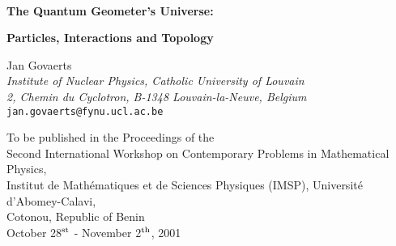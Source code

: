 \documentclass[a4paper,11pt]{article}
\begin{document}
%
\begin{titlepage}
\begin{centering}
 
{\ }\vspace{2cm}
 
{\Large\bf The Quantum Geometer's Universe:}

\vspace{5pt}

{\Large\bf Particles, Interactions and Topology}

\vspace{2cm}

Jan Govaerts\\
\vspace{1.0cm}
{\em Institute of Nuclear Physics, Catholic University of Louvain}\\
{\em 2, Chemin du Cyclotron, B-1348 Louvain-la-Neuve, Belgium}\\
{\tt jan.govaerts@fynu.ucl.ac.be}

\vspace{2cm}

\begin{abstract}

\noindent
With the two most profound conceptual revolutions of XX$^{\rm th}$ century
physics, quantum mechanics and relativity, which have culminated
into relativistic spacetime geometry and quantum gauge field theory
as the principles for gravity and the three other known fundamental
interactions, the physicist of the XXI$^{\rm st}$ century has inherited 
an unfinished symphony: the unification of the quantum and the
continuum. As an invitation to tomorrow's quantum geometers who
must design the new rulers by which to size up the Universe at those
scales where the smallest meets the largest, these lectures review the 
basic principles of today's conceptual framework, and highlight by way 
of simple examples the interplay that presently exists between the
quantum world of particle interactions and the classical world of
geometry and topology.

\end{abstract}

\vspace{35pt}
 
To be published in the Proceedings of the\\
Second International Workshop on Contemporary Problems in Mathematical
Physics,\\
Institut de Math\'ematiques et de Sciences Physiques (IMSP), Universit\'e
d'Abomey-Calavi,\\
Cotonou, Republic of Benin\\
October 28$^{\rm st}$ - November 2$^{\rm th}$, 2001

\end{centering} 

\vspace{100pt}


\end{titlepage}
\end{document}
